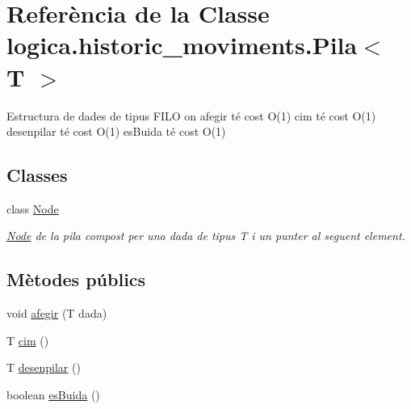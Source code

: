 \hypertarget{classlogica_1_1historic__moviments_1_1_pila_3_01_t_01_4}{\section{Referència de la Classe logica.\+historic\+\_\+moviments.\+Pila$<$ T $>$}
\label{classlogica_1_1historic__moviments_1_1_pila_3_01_t_01_4}
}


Estructura de dades de tipus F\+I\+L\+O on afegir té cost O(1) cim té cost O(1) desenpilar té cost O(1) es\+Buida té cost O(1)  


\subsection*{Classes}
\begin{DoxyCompactItemize}
\item 
class \hyperlink{classlogica_1_1historic__moviments_1_1_pila_3_01_t_01_4_1_1_node}{Node}
\begin{DoxyCompactList}\small\item\em \hyperlink{classlogica_1_1historic__moviments_1_1_pila_3_01_t_01_4_1_1_node}{Node} de la pila compost per una dada de tipus T i un punter al seguent element. \end{DoxyCompactList}\end{DoxyCompactItemize}
\subsection*{Mètodes públics}
\begin{DoxyCompactItemize}
\item 
void \hyperlink{classlogica_1_1historic__moviments_1_1_pila_3_01_t_01_4_a4c7677e80d1a2e750036374680e8de69}{afegir} (T dada)
\item 
T \hyperlink{classlogica_1_1historic__moviments_1_1_pila_3_01_t_01_4_ada68762ef342309936234ed5976a5f89}{cim} ()
\item 
T \hyperlink{classlogica_1_1historic__moviments_1_1_pila_3_01_t_01_4_a4eee9c634e4eb6a3a7fe84132374cee5}{desenpilar} ()
\item 
boolean \hyperlink{classlogica_1_1historic__moviments_1_1_pila_3_01_t_01_4_a8eb489a3420043963be8160a873f6d65}{es\+Buida} ()
\end{DoxyCompactItemize}
